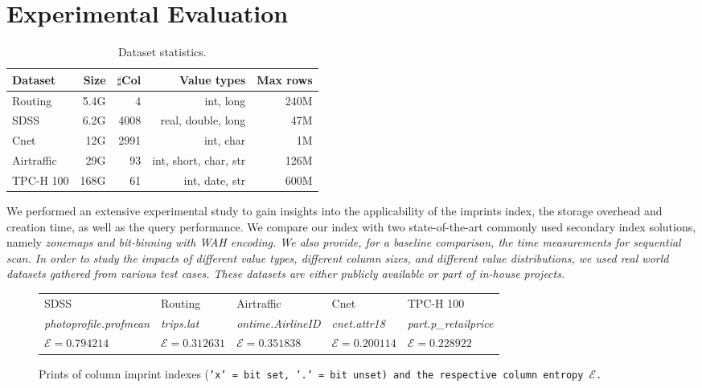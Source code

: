 \section{Experimental Evaluation}\label{sec:evaluation}

\begin{table}
\centering
\begin{tabular}{|l|r|r|r|r|}
\hline
\bf{Dataset}&\bf{Size}&$\sharp$\bf{Col}&\bf{Value types}&\bf{Max rows}\\
\hline
Routing&5.4G&4&\small{int, long}&240M\\
SDSS&6.2G&4008&\small{real, double, long}&47M\\
Cnet&12G&2991&\small{int, char}&1M\\
Airtraffic&29G&93&\small{int, short, char, str}&126M\\
TPC-H 100&168G&61&\small{int, date, str}&600M\\
\hline
\end{tabular}
\caption{Dataset statistics.}
\label{tbl:dataset}
\end{table}

We performed an extensive experimental study to gain insights into the
applicability of the imprints index, the storage overhead and creation
time, as well as the query performance. We compare our index with two
state-of-the-art commonly used secondary index solutions, namely \it{zonemaps}
and \it{bit-binning} with \it{WAH encoding}. We also provide, for a baseline
comparison, the time measurements for sequential scan. In order to study the
impacts of different value types, different column sizes, and different value
distributions, we used real world datasets gathered from various test cases.
These datasets are either publicly available or part of in-house projects.

\begin{figure}[t]
\centering
{}
\begin{tabular}{m{4cm}|m{4cm}|m{2.2cm}|m{2cm}|m{4cm}}
&&&&\\
\hline
SDSS&Routing&Airtraffic&Cnet&TPC-H 100\\
 \it{photoprofile.profmean}&\it{trips.lat}&\it{ontime.AirlineID}&\it{cnet.attr18}&\it{part.p\_retailprice}\\
$\mathcal{E}=0.794214$&$\mathcal{E}=0.312631$&$\mathcal{E}=0.351838$&$\mathcal{E}=0.200114$&$\mathcal{E}=0.228922$\\
\end{tabular}
\caption{Prints of column imprint indexes (\tt{'x'} = bit set, \tt{'.'} = bit unset) and the respective column entropy $\mathcal{E}$.}
\label{fig:snap}
\end{figure}

